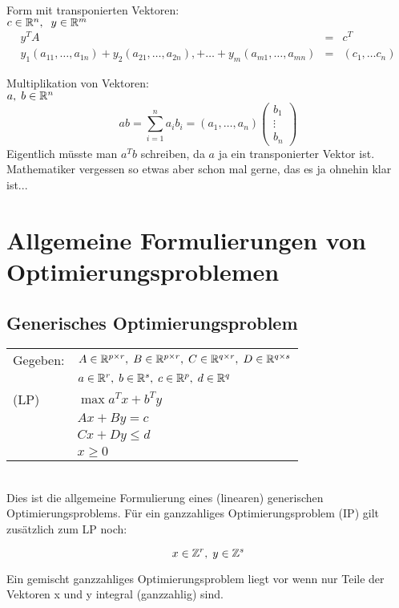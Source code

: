 Form mit transponierten Vektoren:\\
$c \in \mathbb{R}^{n}, \;\; y \in \mathbb{R}^{m}$
\[\begin{array}{rcl} y^{T}A\ &=& c^{T}\\
y_{1}(a_{11}, \ldots, a_{1n}) + y_{2} (a_{21}, \ldots, a_{2n}), + \ldots +
 y_{m} (a_{m1}, \ldots, a_{m n}) &=& (c_{1}, \ldots c_{n})
\end{array}\]

Multiplikation von Vektoren:\\
$a,\; b \in \mathbb{R}^{n}$\\

\[ab = \sum^{n}_{i=1} a_{i} b_{i} = (a_{1}, \ldots, a_{n})
\left(\begin{array}{c}b_{1}\\ \vdots\\ b_{n} \end{array}\right)\]
Eigentlich müsste man $a^{T}b$ schreiben, da $a$ ja ein transponierter
Vektor ist. Mathematiker vergessen so etwas aber schon mal gerne, das es ja
ohnehin klar ist... 


\section{Allgemeine Formulierungen von Optimierungsproblemen}

\subsection{Generisches Optimierungsproblem}
\begin{tabular}{ll}
Gegeben: & $ A \in \mathbb{R}^{p \times r},\;  B \in \mathbb{R}^{p\times r},\; 
C \in \mathbb{R}^{q\times r}, \; D \in \mathbb{R}^{q\times s} $\\
& $a \in \mathbb{R}^{r}, \; b \in \mathbb{R}^{s}, \; c \in \mathbb{R}^{p},\; d \in \mathbb{R}^{q}$\\
(LP)&$\max a^{T}x + b^{T}y$\\
&$A x+ B y = c$\\
&$C x+D y \leq d$\\
&$x \geq 0$\\
\end{tabular}\\

Dies ist die allgemeine Formulierung eines (linearen) generischen
Optimierungsproblems. Für ein ganzzahliges Optimierungsproblem (IP) gilt
zusätzlich zum LP noch:

\[x \in \mathbb{Z}^{r}, \;y \in \mathbb{Z}^{s} \]

Ein gemischt ganzzahliges Optimierungsproblem liegt vor wenn nur Teile
der Vektoren x und y integral (ganzzahlig) sind.


